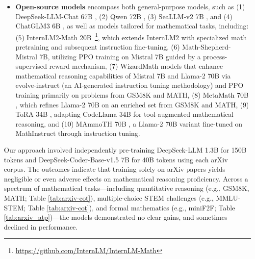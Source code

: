 \begin{itemize}[topsep=0pt]
In order to prevent benchmark contamination, we adopt the approach proposed by \cite{deepseek-coder}, filtering out any web pages that include questions or answers from English mathematical benchmarks like GSM8K \citep{gsm8k} and MATH \citep{MATH}, as well as Chinese datasets such as CMATH \citep{wei2023cmath} and AGIEval \citep{agieval}. Specifically, any segment of text that contains a 10-gram phrase which matches a substring from any of the referenced evaluation benchmarks is excluded from our training corpus. For benchmark segments that are shorter than 10 grams but contain at least 3 grams, we utilize exact matching to identify and remove such contaminated web pages.

These models serve general-purpose functions and have typically been subjected to multiple alignment processes.
    \item \textbf{Open-source models} encompass both general-purpose models, such as (1) DeepSeek-LLM-Chat 67B \citep{deepseek-llm}, (2) Qwen 72B \citep{qwen}, (3) SeaLLM-v2 7B \citep{seallm}, and (4) ChatGLM3 6B \citep{chatglm3}, as well as models tailored for mathematical tasks, including: (5) InternLM2-Math 20B~\footnote{\url{https://github.com/InternLM/InternLM-Math}}, which extends InternLM2 with specialized math pretraining and subsequent instruction fine-tuning, (6) Math-Shepherd-Mistral 7B, utilizing PPO training \citep{schulman2017proximal} on Mistral 7B \citep{mistral} guided by a process-supervised reward mechanism, (7) WizardMath models \citep{wizardmath} that enhance mathematical reasoning capabilities of Mistral 7B and Llama-2 70B \citep{llama2} via evolve-instruct (an AI-generated instruction tuning methodology) and PPO training primarily on problems from GSM8K and MATH, (8) MetaMath 70B \citep{metamath}, which refines Llama-2 70B on an enriched set from GSM8K and MATH, (9) ToRA 34B \cite{tora}, adapting CodeLlama 34B for tool-augmented mathematical reasoning, and (10) MAmmoTH 70B \citep{MathInstruct}, a Llama-2 70B variant fine-tuned on MathInstruct through instruction tuning.
\end{itemize}

Our approach involved independently pre-training DeepSeek-LLM 1.3B for 150B tokens and DeepSeek-Coder-Base-v1.5 7B for 40B tokens using each arXiv corpus. The outcomes indicate that training solely on arXiv papers yields negligible or even adverse effects on mathematical reasoning proficiency. Across a spectrum of mathematical tasks—including quantitative reasoning (e.g., GSM8K, MATH; Table \ref{tab:arxiv-cot}), multiple-choice STEM challenges (e.g., MMLU-STEM; Table \ref{tab:arxiv-cot}), and formal mathematics (e.g., miniF2F; Table \ref{tab:arxiv_atp})—the models demonstrated no clear gains, and sometimes declined in performance.

